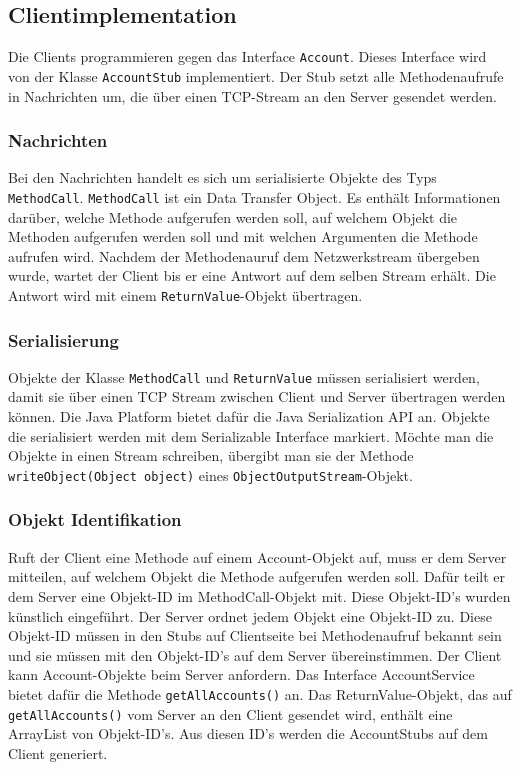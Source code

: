 \subsection{Clientimplementation}
\label{sec:clientimplementation}

Die Clients programmieren gegen das Interface \texttt{Account}. Dieses Interface wird
von der Klasse \texttt{AccountStub} implementiert. Der Stub setzt alle
Methodenaufrufe in Nachrichten um, die über einen TCP-Stream an den
Server gesendet werden. 

\subsubsection{Nachrichten}
\label{sec:nachrichten}


Bei den Nachrichten handelt es sich um
serialisierte Objekte des Typs \-\texttt{Method\-Call}. \texttt{MethodCall} ist ein Data Transfer Object. Es enthält
Informationen darüber, welche Methode aufgerufen werden soll, auf
welchem Objekt die Methoden aufgerufen werden soll und mit welchen
Argumenten die Methode aufrufen wird. Nachdem der Methodenauruf dem
Netzwerkstream übergeben wurde, wartet der Client bis er eine Antwort
auf dem selben Stream erhält. Die Antwort wird mit einem
\texttt{ReturnValue}-Objekt übertragen.

\subsubsection{Serialisierung}
\label{sec:serialisierung}

Objekte der Klasse \texttt{MethodCall} und \texttt{ReturnValue} müssen
serialisiert werden,
da\-mit sie über einen TCP Stream zwischen Client und Server übertragen
werden können. Die Java Platform bietet dafür die Java Serialization
API\cite{greanier00} an. Objekte die serialisiert werden mit dem Serializable Interface
markiert. Möchte man die Objekte in einen Stream schreiben, übergibt
man sie der Methode
\verb|writeObject(Object object)| eines
\texttt{ObjectOutputStream}-Objekt.

\subsubsection{Objekt Identifikation}
\label{sec:objekt-ident}

Ruft der Client eine Methode auf einem Account-Objekt auf, muss er dem
Server mitteilen, auf welchem Objekt die Methode aufgerufen werden
soll. Dafür teilt er dem Server eine Objekt-ID im MethodCall-Objekt
mit. Diese Objekt-ID's wurden künstlich eingeführt. Der Server ordnet
jedem Objekt eine Objekt-ID zu. Diese Objekt-ID müssen in den Stubs auf Clientseite bei
Methodenaufruf bekannt sein und sie müssen mit den Objekt-ID's auf dem
Server übereinstimmen. Der Client kann Account-Objekte beim Server
anfordern. Das Interface AccountService bietet dafür die Methode
\verb|getAllAccounts()| an. Das ReturnValue-Objekt, das auf
\newline \texttt{get\-All\-Accounts()} vom Server an den Client gesendet wird, enthält eine ArrayList von
Objekt-ID's. Aus diesen ID's werden die AccountStubs auf dem Client generiert.

